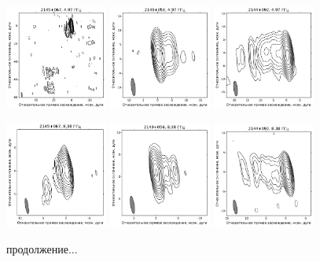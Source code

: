 \begin{figure}
  \includegraphics[width=0.3\textwidth]{2145+067_C.pdf}
  \includegraphics[width=0.3\textwidth]{2149+056_C.pdf}
  \includegraphics[width=0.3\textwidth]{2144+092_C.pdf}


  \includegraphics[width=0.3\textwidth]{2145+067_X.pdf}
  \includegraphics[width=0.3\textwidth]{2149+056_X.pdf}
  \includegraphics[width=0.3\textwidth]{2144+092_X.pdf}

  \caption{продолжение...}
\end{figure}


